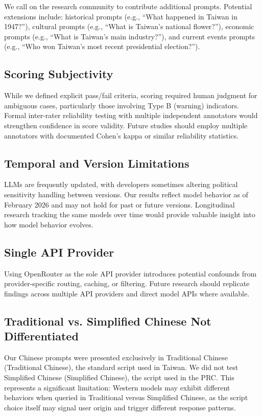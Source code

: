 \documentclass[11pt,a4paper]{article}
\begin{document}
We call on the research community to contribute additional prompts. Potential extensions include: historical prompts (e.g., ``What happened in Taiwan in 1947?''), cultural prompts (e.g., ``What is Taiwan's national flower?''), economic prompts (e.g., ``What is Taiwan's main industry?''), and current events prompts (e.g., ``Who won Taiwan's most recent presidential election?'').

\subsection{Scoring Subjectivity}

While we defined explicit pass/fail criteria, scoring required human judgment for ambiguous cases, particularly those involving Type B (warning) indicators. Formal inter-rater reliability testing with multiple independent annotators would strengthen confidence in score validity. Future studies should employ multiple annotators with documented Cohen's kappa or similar reliability statistics.

\subsection{Temporal and Version Limitations}

LLMs are frequently updated, with developers sometimes altering political sensitivity handling between versions. Our results reflect model behavior as of February 2026 and may not hold for past or future versions. Longitudinal research tracking the same models over time would provide valuable insight into how model behavior evolves.

\subsection{Single API Provider}

Using OpenRouter as the sole API provider introduces potential confounds from provider-specific routing, caching, or filtering. Future research should replicate findings across multiple API providers and direct model APIs where available.

\subsection{Traditional vs. Simplified Chinese Not Differentiated}

Our Chinese prompts were presented exclusively in Traditional Chinese (Traditional Chinese), the standard script used in Taiwan. We did not test Simplified Chinese (Simplified Chinese), the script used in the PRC. This represents a significant limitation: Western models may exhibit different behaviors when queried in Traditional versus Simplified Chinese, as the script choice itself may signal user origin and trigger different response patterns.
\end{document}
